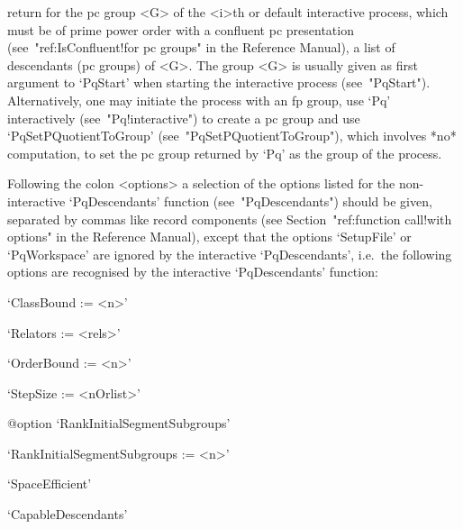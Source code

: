 return for the pc group <G> of the <i>th or default interactive  {\ANUPQ}
process, which  must  be  of  prime  power  order  with  a  confluent  pc
presentation (see~"ref:IsConfluent!for pc groups" in the {\GAP} Reference
Manual), a list of descendants (pc groups)  of  <G>.  The  group  <G>  is
usually  given  as  first  argument  to  `PqStart'  when   starting   the
interactive {\ANUPQ}  process  (see~"PqStart").  Alternatively,  one  may
initiate  the  process  with  an  fp  group,   use   `Pq'   interactively
(see~"Pq!interactive")    to    create    a    pc    group    and     use
`PqSetPQuotientToGroup'  (see~"PqSetPQuotientToGroup"),  which   involves
*no* computation, to set the pc group returned by `Pq' as  the  group  of
the process.

Following the colon <options> a selection of the options listed  for  the
non-interactive `PqDescendants' function (see~"PqDescendants") should  be
given,   separated   by    commas    like    record    components    (see
Section~"ref:function call!with options" in the {\GAP} Reference Manual),
except that the options `SetupFile' or `PqWorkspace' are ignored  by  the
interactive `PqDescendants', i.e.~the following options are recognised by
the interactive `PqDescendants' function:

\beginlist%

\item{}`ClassBound := <n>'

\item{}`Relators := <rels>'

\item{}`OrderBound := <n>'

\item{}`StepSize := <nOrlist>'

%
{@option \noexpand`RankInitialSegmentSubgroups'}
\item{}`RankInitialSegmentSubgroups := <n>'

\item{}`SpaceEfficient'

\item{}`CapableDescendants'

